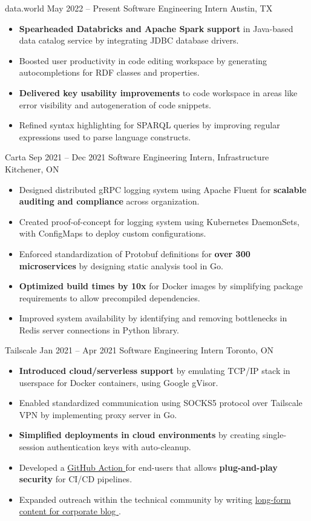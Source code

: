 \documentclass{article}
\begin{document}
\WorkEntry
  {data.world}
  {May 2022 -- Present}
  {Software Engineering Intern \hfill Austin, TX}
  {
    \begin{itemize} \itemsep -1pt
      \item \textbf{Spearheaded Databricks and Apache Spark support} in Java-based data catalog service by integrating JDBC database drivers.
      \item Boosted user productivity in code editing workspace by generating autocompletions for RDF classes and properties.
      \item \textbf{Delivered key usability improvements} to code workspace in areas like error visibility and autogeneration of code snippets.
      \item Refined syntax highlighting for SPARQL queries by improving regular expressions used to parse language constructs.
    \end{itemize}
  }
\WorkEntry
  {Carta}
  {Sep 2021 -- Dec 2021}
  {Software Engineering Intern, Infrastructure \hfill Kitchener, ON}
  {
    \begin{itemize} \itemsep -1pt
      \item Designed distributed gRPC logging system using Apache Fluent for \textbf{scalable auditing and compliance} across organization.
      \item Created proof-of-concept for logging system using Kubernetes DaemonSets, with ConfigMaps to deploy custom configurations.
      \item Enforced standardization of Protobuf definitions for \textbf{over 300 microservices} by designing static analysis tool in Go.
      \item \textbf{Optimized build times by 10x} for Docker images by simplifying package requirements to allow precompiled dependencies.
      \item Improved system availability by identifying and removing bottlenecks in Redis server connections in Python library.
    \end{itemize}
  }
\WorkEntry
  {Tailscale}
  {Jan 2021 -- Apr 2021}
  {Software Engineering Intern \hfill Toronto, ON}
  {
    \begin{itemize} \itemsep -1pt
      \item \textbf{Introduced cloud/serverless support} by emulating TCP/IP stack in userspace for Docker containers, using Google gVisor.
      \item Enabled standardized communication using SOCKS5 protocol over Tailscale VPN by implementing proxy server in Go.
      \item \textbf{Simplified deployments in cloud environments} by creating single-session authentication keys with auto-cleanup.
      \item Developed a \href{https://github.com/tailscale/github-action}{GitHub Action \linkIcon} for end-users that allows \textbf{plug-and-play security} for CI/CD pipelines.
      \item Expanded outreach within the technical community by writing \href{https://tailscale.com/blog/2021-05-github-actions-and-tailscale/}{long-form content for corporate blog \linkIcon}.
    \end{itemize}
  }
\end{document}
